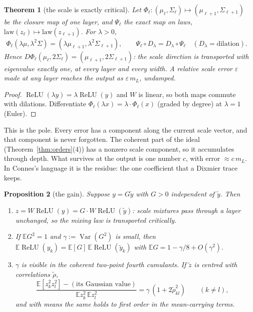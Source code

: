 \documentclass[11pt]{article}
\newtheorem{theorem}{Theorem}[section]
\newtheorem{proposition}[theorem]{Proposition}
\theoremstyle{definition}
\theoremstyle{remark}
\newcommand{\E}{\mathbb E}
\newcommand{\Var}{\operatorname{Var}}
\newcommand{\relu}{\operatorname{ReLU}}
\begin{document}
\begin{theorem}[the scale is exactly critical]\label{thm:scale}
Let $\Phi_\ell:(\mu_\ell,\Sigma_\ell)\mapsto(\mu_{\ell+1},\Sigma_{\ell+1})$ be the closure map of one layer, and $\Psi_\ell$ the exact map on laws, $\mathrm{law}(z_\ell)\mapsto\mathrm{law}(z_{\ell+1})$. For $\lambda>0$,
\[
\Phi_\ell(\lambda\mu,\lambda^2\Sigma)=(\lambda\mu_{\ell+1},\lambda^2\Sigma_{\ell+1}),\qquad \Psi_\ell\circ D_\lambda=D_\lambda\circ\Psi_\ell\quad(D_\lambda=\text{dilation}).
\]
Hence $D\Phi_\ell(\mu_\ell,2\Sigma_\ell)=(\mu_{\ell+1},2\Sigma_{\ell+1})$: the scale direction is transported with eigenvalue exactly one, at every layer and every width. A relative scale error $\varepsilon$ made at any layer reaches the output as $\varepsilon\,m_L$, undamped.
\end{theorem}

\begin{proof}
$\relu(\lambda y)=\lambda\relu(y)$ and $W$ is linear, so both maps commute with dilations. Differentiate $\Phi_\ell(\lambda x)=\lambda\cdot\Phi_\ell(x)$ (graded by degree) at $\lambda=1$ (Euler).
\end{proof}

\noindent This is the pole. Every error has a component along the current scale vector, and that component is never forgotten. The coherent part of the ideal (Theorem~\ref{thm:orders}(4)) has a nonzero scale component, so it accumulates through depth. What survives at the output is one number $c$, with error $\approx c\,m_L$. In Connes's language it is the residue: the one coefficient that a Dixmier trace keeps.

\begin{proposition}[the gain]\label{prop:gain}
Suppose $y=G\tilde y$ with $G>0$ independent of $\tilde y$. Then
\begin{enumerate}
\item $z=W\relu(y)=G\cdot W\relu(\tilde y)$: scale mixtures pass through a layer unchanged, so the mixing law is transported critically.
\item If $\E G^2=1$ and $\gamma:=\Var(G^2)$ is small, then $\E\relu(y_k)=\E[G]\,\E\relu(\tilde y_k)$ with $\E G=1-\gamma/8+O(\gamma^2)$.
\item $\gamma$ is visible in the coherent two-point fourth cumulants. If $\tilde z$ is centred with correlations $\tilde\rho$,
\[
\frac{\E[z_k^2z_l^2]-(\text{its Gaussian value})}{\E z_k^2\,\E z_l^2}=\gamma\,(1+2\tilde\rho_{kl}^2)\qquad(k\ne l),
\]
and with means the same holds to first order in the mean-carrying terms.
\end{enumerate}
\end{proposition}
\end{document}
